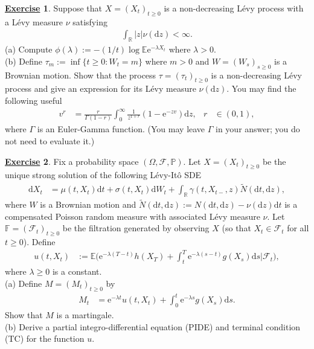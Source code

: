 \documentclass[12pt]{book}
\numberwithin{equation}{chapter}
\theoremstyle{plain}
\numberwithin{theorem}{section}
\theoremstyle{definition}
\newtheorem{exercise}{\underline{Exercise}}
\numberwithin{exercise}{chapter}
\newcommand{\<}{\langle}
\renewcommand{\>}{\rangle}
\renewcommand{\(}{\left(}
\renewcommand{\)}{\right)}
\renewcommand{\[}{\left[}
\renewcommand{\]}{\right]}
\newcommand\Eb{\mathds{E}}
\newcommand\Fb{\mathds{F}}
\newcommand\Pb{\mathds{P}}
\newcommand\Rb{\mathds{R}}
\newcommand\Fc{\mathscr{F}}
\newcommand\Om{\Omega}
\newcommand\sig{\sigma}
\newcommand\gam{\gamma}
\newcommand\Gam{\Gamma}
\newcommand\lam{\lambda}
\newcommand\Nt{\widetilde{N}}
\newcommand\dd{\mathrm{d}}
\newcommand\ee{\mathrm{e}}
\begin{document}
\begin{exercise}
\label{exer:10.11}
Suppose that $X = (X_t)_{t \geq 0}$ is a non-decreasing L\'evy process with a L\'evy measure $\nu$ satisfying 
\begin{align}
\int_\Rb |z| \nu(\dd z)<\infty .
\end{align}
(a) Compute $\phi(\lam) := -(1/t) \log \Eb \ee^{- \lam X_t}$ where $\lam > 0$.
\\[0.5em]
(b) Define $\tau_m := \inf \{ t \geq 0 : W_t = m \}$ where $m > 0$ and $W = (W_s)_{s \geq 0}$ is a Brownian motion.  Show that the process $\tau = (\tau_t)_{t \geq 0}$ is a non-decreasing L\'evy process and give an expression for its L\'evy measure $\nu(\dd z)$.  You may find the following useful
\begin{align}
v^r
	&=	\frac{r}{\Gam(1-r)} \int_0^\infty \frac{1}{z^{1+r}}(1 - \ee^{-zv}) \dd z , &
r
	&\in (0,1) ,
\end{align}
where $\Gam$ is an Euler-Gamma function.  (You may leave $\Gam$ in your answer; you do not need to evaluate it.)
\end{exercise}

\begin{exercise}
\label{exer:10.12}
Fix a probability space $(\Om,\Fc,\Pb)$.
Let $X = (X_t)_{t \geq 0}$ be the unique strong solution of the following L\'evy-It\^o SDE
\begin{align}
\dd X_t
	&=	\mu(t,X_t) \dd t + \sig(t,X_t) \dd W_t + \int_\Rb \gam(t,X_{t-},z) \Nt(\dd t, \dd z) ,
\end{align}
where $W$ is a Brownian motion and $\Nt( \dd t, \dd z) := N(\dd t, \dd z) - \nu(\dd z) \dd t$ is a compensated Poisson random measure with associated L\'evy measure $\nu$.  Let $\Fb = (\Fc_t)_{t \geq 0}$ be the filtration generated by observing $X$ (so that $X_t \in \Fc_t$ for all $t \geq 0$).
Define
\begin{align}
u(t,X_t)
	&:=	\Eb \Big( \ee^{- \lam (T-t)} h(X_T) + \int_t^T \ee^{- \lam (s-t)} g(X_s) \dd s \Big| \Fc_t \Big) ,
\end{align}
where $\lam \geq 0$ is a constant.
\\[0.5em]
(a) Define $M = (M_t)_{t \geq 0}$ by
\begin{align}
M_t
	&=	\ee^{- \lam t} u(t,X_t) + \int_0^t \ee^{- \lam s} g(X_s) \dd s .
\end{align}
Show that $M$ is a martingale.
\\[0.5em]
(b) Derive a partial integro-differential equation (PIDE) and terminal condition (TC) for the function $u$.
\end{exercise}
\end{document}
